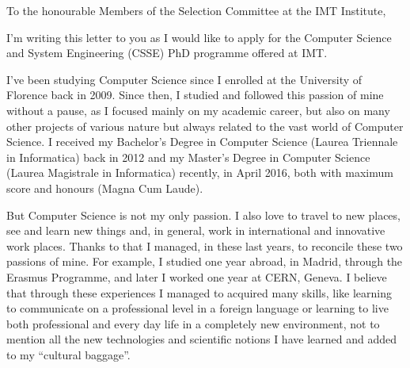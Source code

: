 \documentclass{article}
\begin{document}
    \hspace*{0.5\linewidth}
    
    To the honourable Members of the Selection Committee at the IMT Institute, \par \bigskip
    
    I'm writing this letter to you as I would like to apply for the Computer Science and System
    Engineering (CSSE) PhD programme offered at IMT. \par \bigskip
    
    I've been studying Computer Science since I enrolled at the University of Florence back in 2009. Since then, I studied and followed this passion of mine without a pause, as I focused mainly on my academic career, but also on many other projects of various nature but always related to the vast world of Computer Science. I received my Bachelor's Degree in Computer Science (Laurea Triennale in Informatica) back in 2012 and my Master's Degree in Computer Science (Laurea Magistrale in Informatica) recently, in April 2016, both with maximum score and honours (Magna Cum Laude). \par \bigskip
    
    But Computer Science is not my only passion. I also love to travel to new places, see and learn new things and, in general, work in international and innovative work places. Thanks to that I managed, in these last years, to reconcile these two passions of mine. For example, I studied one year abroad, in Madrid, through the Erasmus Programme, and later I worked one year at CERN, Geneva. I believe that through these experiences I managed to acquired many skills, like learning to communicate on a professional level in a foreign language or learning to live both professional and every day life in a completely new environment, not to mention all the new technologies and scientific notions I have learned and added to my ``cultural baggage''. \par \bigskip
    
\end{document}

